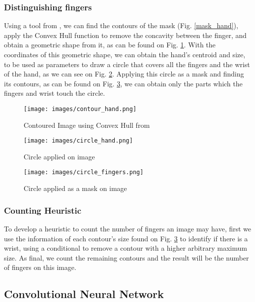 \documentclass[conference]{IEEEtran}
\begin{document}
\subsubsection{Distinguishing fingers}
Using a tool from \cite{cv2}, we can find the contours of the mask (Fig. \ref{mask_hand}), apply the Convex Hull function to remove the concavity between the finger, and obtain a geometric shape from it, as can be found on Fig. \ref{contour_hand}. With the coordinates of this geometric shape, we can obtain the hand's centroid and size, to be used as parameters to draw a circle that covers all the fingers and the wrist of the hand, as we can see on Fig. \ref{circle_hand}. Applying this circle as a mask and finding its contours, as can be found on Fig. \ref{circle_fingers}, we can obtain only the parts which the fingers and wrist touch the circle.

\begin{figure}[htbp]
\centerline{\texttt{[image: images/contour\_hand.png]}}
\caption{Contoured Image using Convex Hull from \cite{cv2}}
\label{contour_hand}
\end{figure}

\begin{figure}[htbp]
\centerline{\texttt{[image: images/circle\_hand.png]}}
\caption{Circle applied on image}
\label{circle_hand}
\end{figure}

\begin{figure}[htbp]
\centerline{\texttt{[image: images/circle\_fingers.png]}}
\caption{Circle applied as a mask on image}
\label{circle_fingers}
\end{figure}

\subsubsection{Counting Heuristic}
To develop a heuristic to count the number of fingers an image may have, first we use the information of each contour's size found on Fig. \ref{circle_fingers} to identify if there is a wrist, using a conditional to remove a contour with a higher arbitrary maximum size. As final, we count the remaining contours and the result will be the number of fingers on this image.

\subsection{Convolutional Neural Network}
\end{document}
